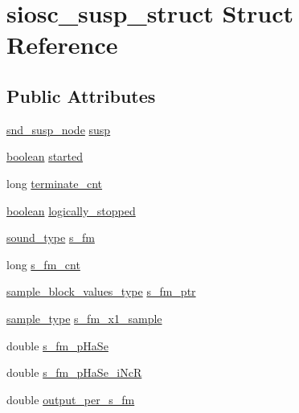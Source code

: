 \hypertarget{structsiosc__susp__struct}{}\section{siosc\+\_\+susp\+\_\+struct Struct Reference}
\label{structsiosc__susp__struct}
\subsection*{Public Attributes}
\begin{DoxyCompactItemize}
\item 
\hyperlink{sound_8h_a6b268203688a934bd798ceb55f85d4c0}{snd\+\_\+susp\+\_\+node} \hyperlink{structsiosc__susp__struct_af41c663308416a3e1760fe7f946e8007}{susp}
\item 
\hyperlink{cext_8h_a7670a4e8a07d9ebb00411948b0bbf86d}{boolean} \hyperlink{structsiosc__susp__struct_a5b4f002379c04f72c17a4e47c6cb3053}{started}
\item 
long \hyperlink{structsiosc__susp__struct_afb123e4b22653b8bdd83a83cbe5d47d6}{terminate\+\_\+cnt}
\item 
\hyperlink{cext_8h_a7670a4e8a07d9ebb00411948b0bbf86d}{boolean} \hyperlink{structsiosc__susp__struct_a1783374d67d3acfd92fdaba24276aca3}{logically\+\_\+stopped}
\item 
\hyperlink{sound_8h_a792cec4ed9d6d636d342d9365ba265ea}{sound\+\_\+type} \hyperlink{structsiosc__susp__struct_ab04fa2b72177133df8b03caa45439573}{s\+\_\+fm}
\item 
long \hyperlink{structsiosc__susp__struct_a2cf5991ccde920729514c66e49df44ef}{s\+\_\+fm\+\_\+cnt}
\item 
\hyperlink{sound_8h_a83d17f7b465d1591f27cd28fc5eb8a03}{sample\+\_\+block\+\_\+values\+\_\+type} \hyperlink{structsiosc__susp__struct_afada00ea0bd1affe0f9f06b20874bd09}{s\+\_\+fm\+\_\+ptr}
\item 
\hyperlink{sound_8h_a3a9d1d4a1c153390d2401a6e9f71b32c}{sample\+\_\+type} \hyperlink{structsiosc__susp__struct_a3451ca6c7b882c49f77fed23abf8305f}{s\+\_\+fm\+\_\+x1\+\_\+sample}
\item 
double \hyperlink{structsiosc__susp__struct_aba4464cacc02794d4f41122b3dc6fee3}{s\+\_\+fm\+\_\+p\+Ha\+Se}
\item 
double \hyperlink{structsiosc__susp__struct_a8664e99de2833ca9db5ff5707f2849ea}{s\+\_\+fm\+\_\+p\+Ha\+Se\+\_\+i\+NcR}
\item 
double \hyperlink{structsiosc__susp__struct_a5d4195dead9c137e6e50e4864cfeb966}{output\+\_\+per\+\_\+s\+\_\+fm}

\end{DoxyCompactItemize}
